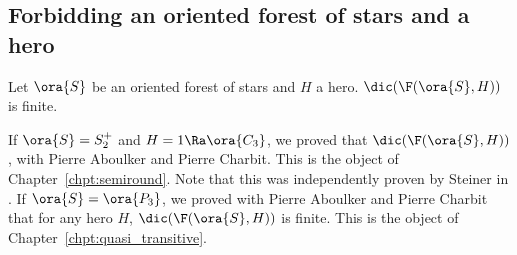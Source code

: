 




%        
%        
%        
        
        



\subsection{Forbidding an oriented forest of stars and a hero}

\begin{conjecture}\label{conj:star_hero}
    Let $\ora{S}$ be an oriented forest of stars and $H$ a hero. $\dic(\F(\ora{S}, H))$ is finite.
\end{conjecture}

If $\ora{S} = S_2^+$ and $H = 1 \Ra \ora{C_3}$, we proved that $\dic(\F(\ora{S}, H))$, with Pierre Aboulker and Pierre Charbit. This is the object of Chapter~\ref{chpt:semiround}. Note that this was independently proven by Steiner in \cite{S21}. If $\ora{S} = \ora{P_3}$, we proved with Pierre Aboulker and Pierre Charbit that for any hero $H$,  $\dic(\F(\ora{S}, H))$ is finite. This is the object of Chapter~\ref{chpt:quasi_transitive}.

